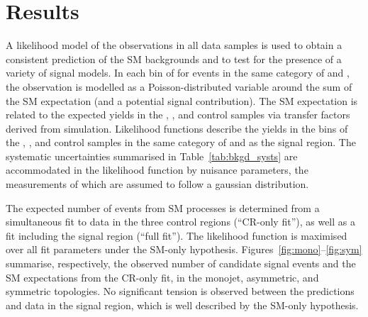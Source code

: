 \section{Results}
\label{sec:results}

A likelihood model of the observations in all data samples is used to
obtain a consistent prediction of the SM backgrounds and to test for
the presence of a variety of signal models.  In each bin of \scalht
for events in the same category of \njet and \nb, the observation is
modelled as a Poisson-distributed variable around the sum of the SM
expectation (and a potential signal contribution). The SM expectation
is related to the expected yields in the \mj, \mmj, and \gj control
samples via transfer factors derived from simulation. Likelihood
functions describe the yields in the \scalht bins of the \mj, \mmj,
and \gj control samples in the same category of \njet and \nb as the
signal region. The systematic uncertainties summarised in
Table~\ref{tab:bkgd_systs} are accommodated in the likelihood function
by nuisance parameters, the measurements of which are assumed to
follow a gaussian distribution. 

The expected number of events from SM processes is determined from a
simultaneous fit to data in the three control regions (``CR-only
fit''), as well as a fit including the signal region (``full
fit''). The likelihood function is maximised over all fit parameters
under the SM-only hypothesis.  Figures~\ref{fig:mono}--\ref{fig:sym}
summarise, respectively, the observed number of candidate signal
events and the SM expectations from the CR-only fit, in the monojet,
asymmetric, and symmetric topologies. No significant tension is
observed between the predictions and data in the signal region, which
is well described by the SM-only hypothesis.


